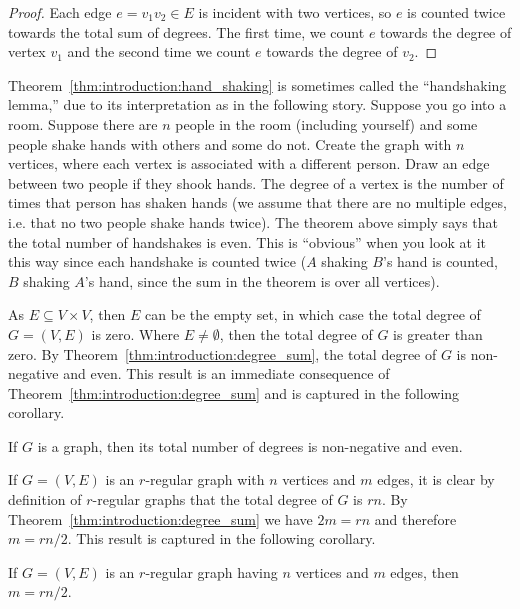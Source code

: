 \begin{proof}
Each edge $e = v_1 v_2 \in E$ is incident with two vertices, so $e$ is
counted twice towards the total sum of degrees. The first time, we
count $e$ towards the degree of vertex $v_1$ and the second time we
count $e$ towards the degree of $v_2$.
\end{proof}

Theorem~\ref{thm:introduction:hand_shaking} is sometimes called the
``handshaking lemma,'' due to its interpretation as in the following
story. Suppose you go into a room. Suppose there are $n$ people in the
room (including yourself) and some people shake hands with others and
some do not. Create the graph with $n$ vertices, where each vertex is
associated with a different person. Draw an edge between two people if
they shook hands. The degree of a vertex is the number of times that
person has shaken hands (we assume that there are no multiple edges,
i.e. that no two people shake hands twice). The theorem above simply
says that the total number of handshakes is even. This is ``obvious''
when you look at it this way since each handshake is counted twice
($A$ shaking $B$'s hand is counted, $B$ shaking $A$'s hand, since the
sum in the theorem is over all vertices).

As $E \subseteq V \times V$, then $E$ can be the empty set, in which
case the total degree of $G = (V, E)$ is zero. Where $E \neq
\emptyset$, then the total degree of $G$ is greater than zero. By
Theorem~\ref{thm:introduction:degree_sum}, the total degree of $G$ is
non-negative and even. This result is an immediate consequence of
Theorem~\ref{thm:introduction:degree_sum} and is captured in the
following corollary.

\begin{corollary}
\label{cor:introduction:degree_sum_even}
If $G$ is a graph, then its total number of degrees is non-negative
and even.
\end{corollary}

If $G = (V, E)$ is an $r$-regular graph with $n$ vertices and $m$
edges, it is clear by definition of $r$-regular graphs that the total
degree of $G$ is $rn$. By Theorem~\ref{thm:introduction:degree_sum} we
have $2m = rn$ and therefore $m = rn / 2$. This result is captured in
the following corollary.

\begin{corollary}
If $G = (V, E)$ is an $r$-regular graph having $n$ vertices and $m$
edges, then $m = rn / 2$.
\end{corollary}


